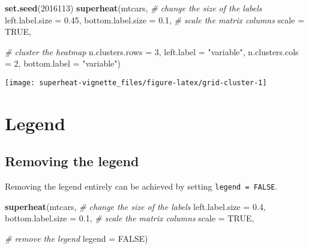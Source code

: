 \documentclass[]{book}
\newenvironment{Shaded}{\begin{snugshade}}{\end{snugshade}}
\newcommand{\KeywordTok}[1]{\textcolor[rgb]{0.13,0.29,0.53}{\textbf{{#1}}}}
\newcommand{\DataTypeTok}[1]{\textcolor[rgb]{0.13,0.29,0.53}{{#1}}}
\newcommand{\DecValTok}[1]{\textcolor[rgb]{0.00,0.00,0.81}{{#1}}}
\newcommand{\FloatTok}[1]{\textcolor[rgb]{0.00,0.00,0.81}{{#1}}}
\newcommand{\StringTok}[1]{\textcolor[rgb]{0.31,0.60,0.02}{{#1}}}
\newcommand{\CommentTok}[1]{\textcolor[rgb]{0.56,0.35,0.01}{\textit{{#1}}}}
\newcommand{\OtherTok}[1]{\textcolor[rgb]{0.56,0.35,0.01}{{#1}}}
\newcommand{\NormalTok}[1]{{#1}}
\theoremstyle{definition}
\theoremstyle{definition}
\theoremstyle{remark}
\begin{document}
\begin{Shaded}
\begin{Highlighting}[]
\KeywordTok{set.seed}\NormalTok{(}\DecValTok{2016113}\NormalTok{)}
\KeywordTok{superheat}\NormalTok{(mtcars,}
          \CommentTok{# change the size of the labels}
          \DataTypeTok{left.label.size =} \FloatTok{0.45}\NormalTok{,}
          \DataTypeTok{bottom.label.size =} \FloatTok{0.1}\NormalTok{,}
          \CommentTok{# scale the matrix columns}
          \DataTypeTok{scale =} \OtherTok{TRUE}\NormalTok{,}
          
          \CommentTok{# cluster the heatmap}
          \DataTypeTok{n.clusters.rows =} \DecValTok{3}\NormalTok{,}
          \DataTypeTok{left.label =} \StringTok{"variable"}\NormalTok{,}
          \DataTypeTok{n.clusters.cols =} \DecValTok{2}\NormalTok{,}
          \DataTypeTok{bottom.label =} \StringTok{"variable"}\NormalTok{)}
\end{Highlighting}
\end{Shaded}

\begin{center}\texttt{[image: superheat-vignette\_files/figure-latex/grid-cluster-1]} \end{center}

\chapter{Legend}\label{legend}

\section{Removing the legend}\label{removing-the-legend}

Removing the legend entirely can be achieved by setting
\texttt{legend\ =\ FALSE}.

\begin{Shaded}
\begin{Highlighting}[]
\KeywordTok{superheat}\NormalTok{(mtcars,}
          \CommentTok{# change the size of the labels}
          \DataTypeTok{left.label.size =} \FloatTok{0.4}\NormalTok{,}
          \DataTypeTok{bottom.label.size =} \FloatTok{0.1}\NormalTok{,}
          \CommentTok{# scale the matrix columns}
          \DataTypeTok{scale =} \OtherTok{TRUE}\NormalTok{,}
          
          \CommentTok{# remove the legend}
          \DataTypeTok{legend =} \OtherTok{FALSE}\NormalTok{)}
\end{Highlighting}
\end{Shaded}
\end{document}
